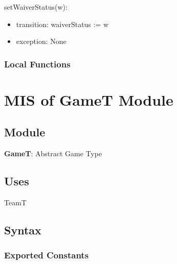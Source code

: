 \documentclass[12pt, titlepage]{article}
\begin{document}
\noindent setWaiverStatus(w):
\begin{itemize}
  \item transition: waiverStatus := w
  \item exception: None
\end{itemize}


\subsubsection{Local Functions}

\newpage

\section{MIS of GameT Module} \label{GameTModule}

\subsection{Module}
\textbf{GameT}: Abstract Game Type

\subsection{Uses}
TeamT

\subsection{Syntax}

\subsubsection{Exported Constants}
\end{document}
